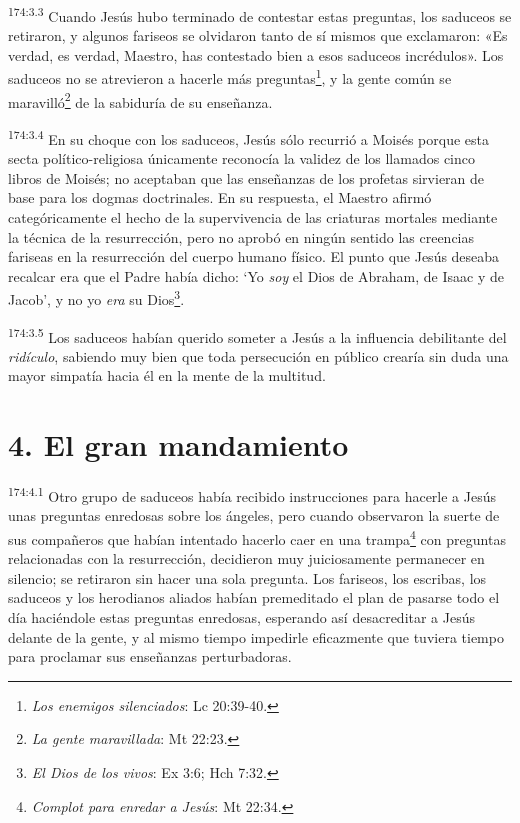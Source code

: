 \par
\textsuperscript{174:3.3} Cuando Jesús hubo terminado de contestar estas preguntas, los saduceos se retiraron, y algunos fariseos se olvidaron tanto de sí mismos que exclamaron: «Es verdad, es verdad, Maestro, has contestado bien a esos saduceos incrédulos». Los saduceos no se atrevieron a hacerle más preguntas\footnote{\textit{Los enemigos silenciados}: Lc 20:39-40.}, y la gente común se maravilló\footnote{\textit{La gente maravillada}: Mt 22:23.} de la sabiduría de su enseñanza.

\par
\textsuperscript{174:3.4} En su choque con los saduceos, Jesús sólo recurrió a Moisés porque esta secta político-religiosa únicamente reconocía la validez de los llamados cinco libros de Moisés; no aceptaban que las enseñanzas de los profetas sirvieran de base para los dogmas doctrinales. En su respuesta, el Maestro afirmó categóricamente el hecho de la supervivencia de las criaturas mortales mediante la técnica de la resurrección, pero no aprobó en ningún sentido las creencias fariseas en la resurrección del cuerpo humano físico. El punto que Jesús deseaba recalcar era que el Padre había dicho: `Yo \textit{soy} el Dios de Abraham, de Isaac y de Jacob', y no yo \textit{era} su Dios\footnote{\textit{El Dios de los vivos}: Ex 3:6; Hch 7:32.}.

\par
\textsuperscript{174:3.5} Los saduceos habían querido someter a Jesús a la influencia debilitante del \textit{ridículo}, sabiendo muy bien que toda persecución en público crearía sin duda una mayor simpatía hacia él en la mente de la multitud.

\section*{4. El gran mandamiento}
\par
\textsuperscript{174:4.1} Otro grupo de saduceos había recibido instrucciones para hacerle a Jesús unas preguntas enredosas sobre los ángeles, pero cuando observaron la suerte de sus compañeros que habían intentado hacerlo caer en una trampa\footnote{\textit{Complot para enredar a Jesús}: Mt 22:34.} con preguntas relacionadas con la resurrección, decidieron muy juiciosamente permanecer en silencio; se retiraron sin hacer una sola pregunta. Los fariseos, los escribas, los saduceos y los herodianos aliados habían premeditado el plan de pasarse todo el día haciéndole estas preguntas enredosas, esperando así desacreditar a Jesús delante de la gente, y al mismo tiempo impedirle eficazmente que tuviera tiempo para proclamar sus enseñanzas perturbadoras.

